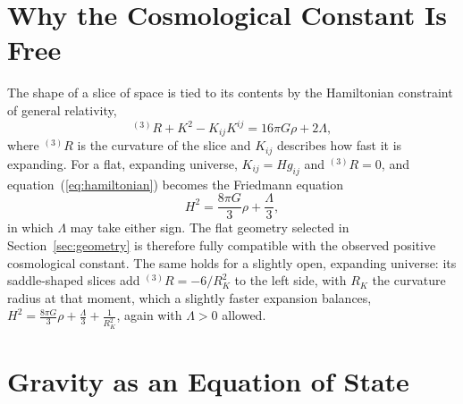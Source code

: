 \documentclass[aps,prd,onecolumn,nofootinbib,superscriptaddress]{revtex4-2}
\begin{document}
\section{Why the Cosmological Constant Is Free}
\label{sec:lambda}

The shape of a slice of space is tied to its contents by the Hamiltonian constraint of general relativity,
\begin{equation}
{}^{(3)}\!R + K^2 - K_{ij}K^{ij} = 16\pi G\rho + 2\Lambda,
\label{eq:hamiltonian}
\end{equation}
where ${}^{(3)}\!R$ is the curvature of the slice and $K_{ij}$ describes how fast it is expanding. For a flat, expanding universe, $K_{ij} = H g_{ij}$ and ${}^{(3)}\!R = 0$, and equation~(\ref{eq:hamiltonian}) becomes the Friedmann equation
\begin{equation}
H^2 = \frac{8\pi G}{3}\rho + \frac{\Lambda}{3},
\end{equation}
in which $\Lambda$ may take either sign. The flat geometry selected in Section~\ref{sec:geometry} is therefore fully compatible with the observed positive cosmological constant. The same holds for a slightly open, expanding universe: its saddle-shaped slices add ${}^{(3)}\!R = -6/R_K^2$ to the left side, with $R_K$ the curvature radius at that moment, which a slightly faster expansion balances, $H^2 = \tfrac{8\pi G}{3}\rho + \tfrac{\Lambda}{3} + \tfrac{1}{R_K^2}$, again with $\Lambda>0$ allowed.

\section{Gravity as an Equation of State}
\label{sec:dynamics}
\end{document}
